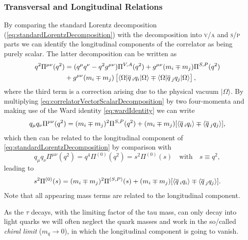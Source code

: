 \documentclass[../../index.tex]{subfiles}
\begin{document}
\subsubsection{Transversal and Longitudinal Relations}
By comparing the standard Lorentz decomposition
(\cref{eq:standardLorentzDecomposition}) with the decomposition into
\textsc{v}/\textsc{a} and \textsc{s}/\textsc{p} parts we can identify the
longitudinal components of the correlator as being purely scalar. The latter
decomposition can be written as \cite{Broadhurst1981,Jamin1992}
\begin{equation}
  \label{eq:correlatorVectorScalarDecomposition}
  \begin{split}
    q^2\Pi^{\mu\nu}(q^2) &= (q^\mu q^\nu - q^2 g^{\mu\nu}) \Pi^{V,A}(q^2) + g^{\mu\nu} (m_i \mp m_j)\Pi^{S,P}(q^2) \\
    &+ g^{\mu\nu}(m_i \mp m_j) \left[ \langle\Omega\vert \overline{q}\,_i q_i
      \vert\Omega\rangle \mp \langle\Omega\vert \overline{q}\,_j q_j
      \vert\Omega\rangle\right],
  \end{split}
\end{equation}
where the third term is a correction arising due to the physical vacuum
\(|\Omega\rangle\). By multiplying \cref{eq:correlatorVectorScalarDecomposition}
by two four-momenta and making use of the Ward identity \cref{eq:wardIdentity}
we can write
\begin{equation}
  q_\mu q_\nu \Pi^{\mu\nu}(q^2) = (m_i \mp m_j)^2 \Pi^{S,P}(q^2) + (m_i \mp m_j)[\langle \overline{q}\,_i q_i \rangle \mp \langle \overline{q}\,_j q_j \rangle],
\end{equation}
which then can be related to the longitudinal component of
\cref{eq:standardLorentzDecomposition} by comparison with
\begin{equation}
  q_\mu q_\nu \Pi^{\mu\nu}(q^2) = q^4 \Pi^{(0)}(q^2) = s^2 \Pi^{(0)}(s) \quad \text{with} \quad s\equiv q^2,
\end{equation}
leading to
\begin{equation}
  \label{eq:longitudinalTwoPointFunction}
  s^2 \Pi^{(0)}(s) = (m_i \mp m_j)^2 \Pi^{(S,P)}(s) + (m_i \mp m_j)[ \langle \overline{q}\,_i q_i \rangle \mp \langle \overline{q}\,_j q_j \rangle].
\end{equation}
Note that all appearing mass terms are related to the longitudinal component.

As the \(\tau\) decays, with the limiting factor of the tau mass, can only decay into
light quarks we will often neglect the quark masses and work in the so\-/called
\textit{chiral limit} (\(m_q \to 0\)), in which the longitudinal component is
going to vanish.
\end{document}
